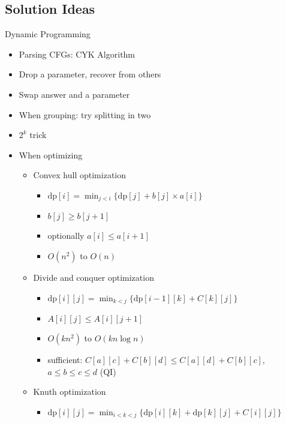     \subsection{Solution Ideas}
      \begin{myitemize}
        \item Dynamic Programming
          \begin{itemize}
            \item Parsing CFGs: CYK Algorithm
            \item Drop a parameter, recover from others
            \item Swap answer and a parameter
            \item When grouping: try splitting in two
            \item $2^k$ trick
            \item When optimizing
                \begin{itemize}
                  \item Convex hull optimization
                    \begin{itemize}
                      \item $\mathrm{dp}[i] = \min_{j<i}\{\mathrm{dp}[j] + b[j] \times a[i]\}$
                      \item $b[j] \geq b[j+1]$
                      \item optionally $a[i] \leq a[i+1]$
                      \item $O(n^2)$ to $O(n)$
                    \end{itemize}
                  \item Divide and conquer optimization
                    \begin{itemize}
                      \item $\mathrm{dp}[i][j] = \min_{k<j}\{\mathrm{dp}[i-1][k] + C[k][j]\}$
                      \item $A[i][j] \leq A[i][j+1]$
                      \item $O(kn^2)$ to $O(kn\log{n})$
                      \item sufficient: $C[a][c] + C[b][d] \leq C[a][d] + C[b][c]$, $a\leq b\leq c\leq d$ (QI)
                    \end{itemize}
                  \item Knuth optimization
                    \begin{itemize}
                      \item $\mathrm{dp}[i][j] = \min_{i<k<j}\{\mathrm{dp}[i][k] + \mathrm{dp}[k][j] + C[i][j]\}$

\end{itemize}
\end{itemize}
\end{itemize}
\end{myitemize}
